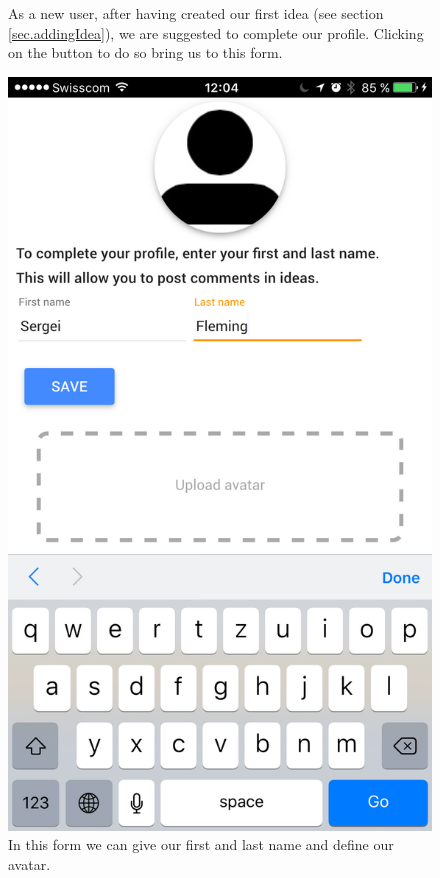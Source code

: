 \documentclass[a4paper,12pt,twoside]{article}
\begin{document}
\begin{figure}[!htb]
\begin{minipage}[t]{.32\textwidth}
        \caption{As a new user, after having created our first idea (see section \ref{sec.addingIdea}), we are suggested to complete our profile. Clicking on the button to do so bring us to this form.}
    \end{minipage}
    \hfill
    \begin{minipage}[t]{.32\textwidth}
        \centering
        \includegraphics[width=\textwidth]{images/flow_completingProfile_2.png}
        \caption{In this form we can give our first and last name and define our avatar.}

\end{minipage}
\end{figure}
\end{document}
